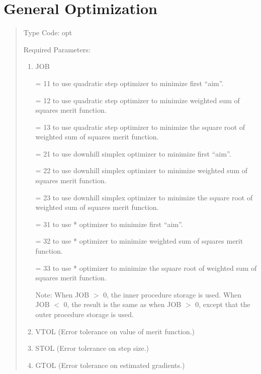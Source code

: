 \section{General Optimization}  
\begin{quotation}
\noindent Type Code:  opt
\vspace{5mm}

\noindent Required Parameters:
\begin{enumerate}
       \item  JOB

              = 11 to use quadratic step optimizer to minimize first ``aim''.

			  = 12 to use quadratic step optimizer to minimize weighted sum of
			  squares \hspace*{1em}merit function.

			  = 13 to use quadratic step optimizer to minimize the square root
			   of weighted \hspace*{1em}sum of squares merit function.

			   = 21 to use downhill simplex optimizer to minimize first ``aim''.

			   = 22 to use downhill simplex optimizer to minimize weighted sum of
			  squares \hspace*{1em}merit function.

			  = 23 to use downhill simplex optimizer to minimize the square root
			  of \hspace*{1em} weighted sum of squares merit function.

			  = 31 to use * optimizer to minimize first ``aim''.

			 = 32 to use * optimizer to minimize weighted sum of
			  squares merit function.

			 = 33 to use * optimizer to minimize the square root of
			 weighted sum of \hspace*{1em}squares merit function.


			  Note:  When JOB $>$ 0, the inner procedure storage is used.  When JOB $<$ 0, the result is
the same as when JOB $>$ 0, except that the outer procedure storage is used.


       \item  VTOL (Error tolerance on value of merit function.)

       \item  STOL (Error tolerance on step size.)

       \item  GTOL (Error tolerance on estimated gradients.)


\end{enumerate}
\end{quotation}
